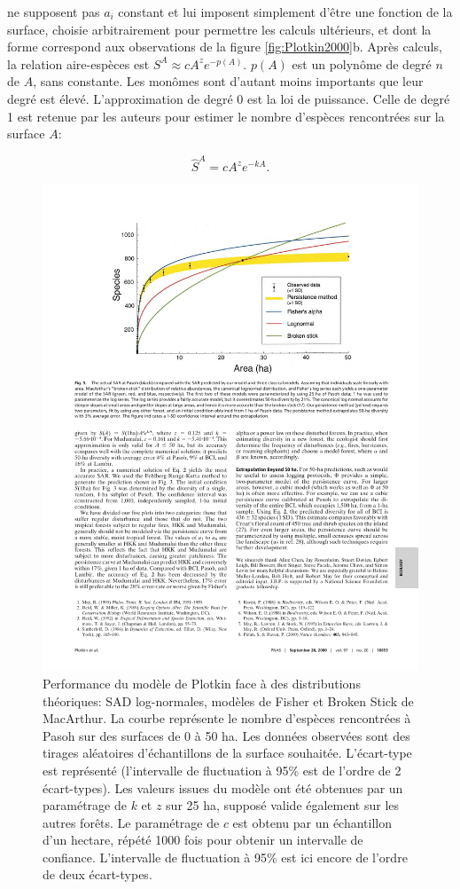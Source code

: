\documentclass[
  11pt,
  french,
  a4paper,
  extrafontsizes,onecolumn,openright
  ]{memoir}
\newlength{\rf}
\begin{document}
\textcite{Plotkin2000} ne supposent pas \(a_i\) constant et lui imposent simplement d'être une fonction de la surface, choisie arbitrairement pour permettre les calculs ultérieurs, et dont la forme correspond aux observations de la figure \ref{fig:Plotkin2000}b.
Après calculs, la relation aire-espèces est \(S^{A}\approx cA^z e^{-p\left(A\right)}\).
\(p(A)\) est un polynôme de degré \(n\) de \(A\), sans constante.
Les monômes sont d'autant moins importants que leur degré est élevé.
L'approximation de degré 0 est la loi de puissance.
Celle de degré 1 est retenue par les auteurs pour estimer le nombre d'espèces rencontrées sur la surface \(A\):

\begin{equation}
  \label{eq:Plotkin2000}
  \hat{S}^{A} = cA^z e^{-kA}.
\end{equation}



\scriptsize

\begin{figure}

{\centering \includegraphics[width=0.8\linewidth]{images/Plotkin2000b} 

}

\caption{Performance du modèle de Plotkin face à des distributions théoriques: SAD log-normales, modèles de Fisher et Broken Stick de MacArthur. La courbe représente le nombre d'espèces rencontrées à Pasoh sur des surfaces de 0 à 50 ha. Les données observées sont des tirages aléatoires d'échantillons de la surface souhaitée. L'écart-type est représenté (l'intervalle de fluctuation à 95\% est de l'ordre de 2 écart-types). Les valeurs issues du modèle ont été obtenues par un paramétrage de \(k\) et \(z\) sur 25 ha, supposé valide également sur les autres forêts. Le paramétrage de \(c\) est obtenu par un échantillon d'un hectare, répété 1000 fois pour obtenir un intervalle de confiance. L'intervalle de fluctuation à 95\% est ici encore de l'ordre de deux écart-types.}\label{fig:Plotkin2000b}
\end{figure}
\end{document}
